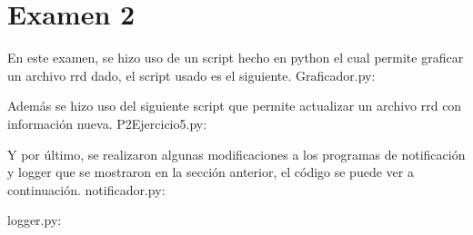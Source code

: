 \section{Examen 2}
En este examen, se hizo uso de un script hecho en python el cual permite graficar un archivo rrd dado, el script usado es el siguiente.\newline
Graficador.py:

Además se hizo uso del siguiente script que permite actualizar un archivo rrd con información nueva.\newline
P2Ejercicio5.py:

Y por último, se realizaron algunas modificaciones a los programas de notificación y logger que se mostraron en la sección anterior, el código se puede ver a continuación.\newline
notificador.py:

logger.py:
